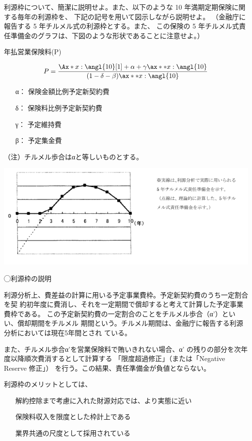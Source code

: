 \documentclass[report,gutter=10mm,fore-edge=10mm,uplatex,dvipdfmx]{jlreq}
\begin{document}
利源枠について、簡潔に説明せよ。また、以下のような 10 年満期定期保険に関する毎年の利源枠を、
下記の記号を用いて図示しながら説明せよ。
（金融庁に報告する 5 年チルメル式の利源枠とする。また、
この保険の 5 年チルメル式責任準備金のグラフは、下図のような形状であることに注意せよ。）

年払営業保険料(P) 

$$P=\frac{\Ax*{x:\angl{10}[1]}+\alpha+\gamma\ax**{x:\angl{10}}}{(1-\delta-\beta)\ax**{x:\angl{10}}}$$

\begin{itemize}
\item[ α：] 保険金額比例予定新契約費
\item[ δ：] 保険料比例予定新契約費
\item[ γ：] 予定維持費
\item[ β：] 予定集金費
\end{itemize}
（注）チルメル歩合はαと等しいものとする。

\includegraphics[scale=0.8]{images/ProbH15-2-2-2.png}

\answer{}

◯利源枠の説明

利源分析上、費差益の計算に用いる予定事業費枠。予定新契約費のうち一定割合を契
約初年度に費消し、それを一定期間で償却すると考えて計算した予定事業費枠である。
この予定新契約費の一定割合のことをチルメル歩合（α'）といい、償却期間をチルメル
期間という。チルメル期間は、金融庁に報告する利源分析においては現在5年間とされ
ている。

また、チルメル歩合α'を営業保険料で賄いきれない場合、α'
の残りの部分を次年度以降順次費消するとして計算する
「限度超過修正」（または「Negative Reserve 修正」）
を行う。この結果、責任準備金が負値とならない。

利源枠のメリットとしては、
\begin{itemize}
\item[] 解約控除まで考慮に入れた財源対応では、より実態に近い
\item[] 保険料収入を限度とした枠計上である
\item[] 業界共通の尺度として採用されている
\end{itemize}
\end{document}
